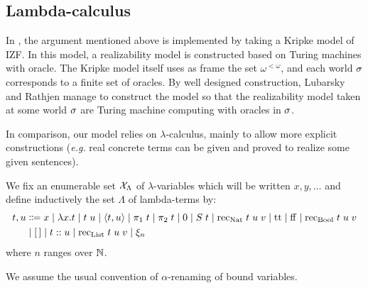 \documentclass[a4paper,UKenglish,cleveref, autoref, thm-restate]{lipics-v2021}
\begin{document}
\subsection{Lambda-calculus}
\label{}

In \cite{LubRat13}, the argument mentioned above is implemented by taking a Kripke model of IZF. In this model, a realizability model is constructed based on Turing machines with oracle. The Kripke model itself uses as frame the set $\omega^{<\omega}$, and each world $\sigma$ corresponds to a finite set of oracles. By well designed construction, Lubarsky and Rathjen manage to construct the model so that the realizability model taken at some world $\sigma$ are Turing machine computing with oracles in $\sigma$.

In comparison, our model relies on $\lambda$-calculus, mainly to allow more explicit constructions (\textit{e.g.} real concrete terms can be given and proved to realize some given sentences).




\begin{definition}
  We fix an enumerable set $\mathcal{X}_\Lambda$ of $\lambda$-variables which will be written
  $x,y,\ldots$ and define inductively the set $\Lambda$ of lambda-terms by:
  \begin{align*}
    t,u  &\Coloneq  x \mid \lambda x.t \mid t\;u
     \mid \langle t,u\rangle \mid \pi_1\;t \mid \pi_2\;t
    \mid \lamZ \mid \lamS\;t \mid \rec_{\Nat}\;t\;u\;v
     \mid \rtt \mid \rff \mid \rec_{\Bool}\;t\;u\;v\\
    & \mid \nil \mid t\append u \mid \rec_{\List}\;t\;u\;v
     \mid \oracle_n
  \end{align*}
  where $n$ ranges over $\mathbb N$.
\end{definition}

We assume the usual convention of $\alpha$-renaming of bound variables.
\end{document}
